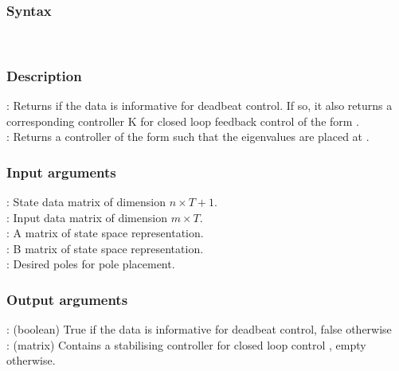 \subsubsection*{Syntax}
 \\

\subsubsection*{Description}
: Returns if the data is informative for deadbeat control. If so, it also returns a corresponding controller K for closed loop feedback control of the form .\\
: Returns a controller of the form  such that the eigenvalues are placed at . 

\subsubsection*{Input arguments}
\textbf{}: State data matrix of dimension $n \times T+1$.\\
\textbf{}: Input data matrix of dimension $m \times T$.\\
\textbf{}: A matrix of state space representation.\\
\textbf{}: B matrix of state space representation.\\
\textbf{}: Desired poles for pole placement.

\subsubsection*{Output arguments}
\textbf{}: (boolean) True if the data is informative for deadbeat control, false otherwise\\
\textbf{}: (matrix) Contains a stabilising controller  for closed loop control , empty otherwise.

